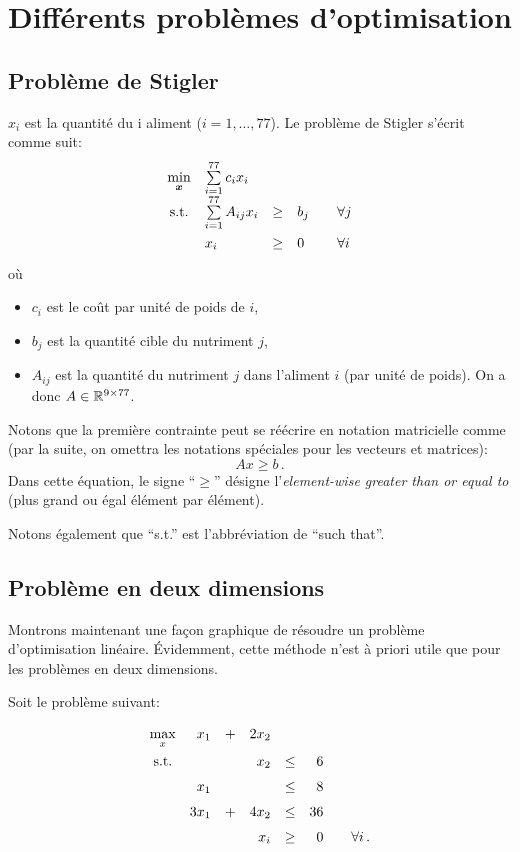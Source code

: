 \section{Différents problèmes d'optimisation}

\subsection{Problème de Stigler}

	$x_i$ est la quantité du i\ieme{} aliment ($i = 1,\dots,77$).
	Le problème de Stigler s'écrit comme suit:
	\begin{equation*}
	\renewcommand{\arraystretch}{1.5}
	\begin{array}{c@{\quad} l c l@{\qquad} l}
		\min\limits_{\bm{x}} & \sum\limits_{i = 1}^{77} c_i x_i & & & \\
		\textnormal{s.t.} & \sum\limits_{i = 1}^{77} A_{ij} x_i & \ge & b_j & \forall j\\
		& x_i & \ge & 0 & \forall i
	\end{array}
	\end{equation*}
	où
	\begin{itemize}
		\item $c_i$ est le coût par unité de poids de $i$,
		\item $b_j$ est la quantité cible du nutriment $j$,
		\item $A_{ij}$ est la quantité du nutriment $j$
		dans l'aliment $i$ (par unité de poids).
		On a donc $A \in \mathbb{R}^{9 \times 77}$.
	\end{itemize}

	Notons que la première contrainte
	peut se réécrire en notation matricielle comme
	(par la suite,
	on omettra les notations spéciales pour les vecteurs et matrices):
	\[
	Ax \ge b\,.
	\]
	Dans cette équation,
	le signe ``$\ge$'' désigne
	l'\emph{element-wise greater than or equal to}
	(plus grand ou égal élément par élément).

	Notons également que ``s.t.'' est l'abbréviation de ``such that''.

\subsection{Problème en deux dimensions}

	Montrons maintenant une façon graphique
	de résoudre un problème d'optimisation linéaire.
	Évidemment, cette méthode n'est à priori utile
	que pour les problèmes en deux dimensions.

	Soit le problème suivant:
	\begin{equation*}
	\begin{array}{c@{\quad} r c r c r@{\qquad} l}
		\max\limits_{x} & x_1 & + & 2 x_2 & & &\\
		\textnormal{s.t.} & & & x_2 & \le & 6 &\\
		& x_1 & & & \le & 8 &\\
		& 3 x_1 & + & 4 x_2 & \le & 36 & \\
		& & & x_i & \ge & 0 & \forall i\,.
	\end{array}
	\end{equation*}

